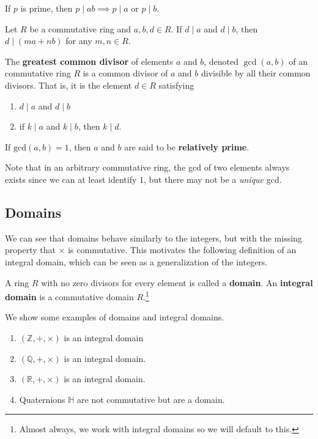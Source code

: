   \begin{lemma}[Euclid]
    If $p$ is prime, then $p \mid ab \implies p \mid a$ or $p \mid b$.  
  \end{lemma}

  \begin{lemma} 
    Let $R$ be a commutative ring and $a, b, d \in R$. If $d \mid a$ and $d \mid b$, then $d \mid (ma + nb)$ for any $m, n \in R$. 
  \end{lemma} 

  \begin{definition}
    The \textbf{greatest common divisor} of elements $a$ and $b$, denoted $\gcd(a, b)$ of an commutative ring $R$ is a common divisor of $a$ and $b$ divisible by all their common divisors. That is, it is the element $d \in R$ satisfying 
    \begin{enumerate}
      \item $d \mid a$ and $d \mid b$ 
      \item if $k \mid a$ and $k \mid b$, then $k \mid d$. 
    \end{enumerate}
    If $\mathrm{gcd}(a, b) = 1$, then $a$ and $b$ are said to be \textbf{relatively prime}. 
  \end{definition} 

  Note that in an arbitrary commutative ring, the gcd of two elements always exists since we can at least identify $1$, but there may not be a \textit{unique} gcd. 

\subsection{Domains}

  We can see that domains behave similarly to the integers, but with the missing property that $\times$ is commutative. This motivates the following definition of an integral domain, which can be seen as a generalization of the integers. 

  \begin{definition}
    A ring $R$ with no zero divisors for every element is called a \textbf{domain}. An \textbf{integral domain} is a commutative domain $R$.\footnote{Almost always, we work with integral domains so we will default to this.} 
  \end{definition} 

  \begin{example}
    We show some examples of domains and integral domains. 
    \begin{enumerate}
      \item $(\mathbb{Z}, +, \times)$ is an integral domain
      \item $(\mathbb{Q}, +, \times)$ is an integral domain. 
      \item $(\mathbb{R}, +, \times)$ is an integral domain. 
      \item Quaternions $\mathbb{H}$ are not commutative but are a domain. 
    \end{enumerate}
  \end{example} 

